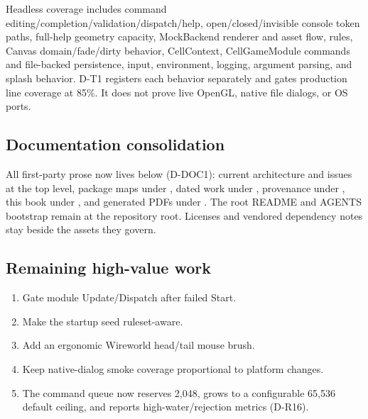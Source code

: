 Headless coverage includes command editing/completion/validation/dispatch/help,
open/closed/invisible console token paths, full-help geometry capacity,
MockBackend renderer and asset flow, rules, Canvas domain/fade/dirty behavior,
CellContext, CellGameModule commands and file-backed persistence, input,
environment, logging, argument parsing, and splash behavior. D-T1 registers
each behavior separately and gates production line coverage at 85\%. It does
not prove live OpenGL, native file dialogs, or OS ports.

\subsection{Documentation consolidation}

All first-party prose now lives below  (D-DOC1): current
architecture and issues at the top level, package maps under ,
dated work under , provenance under , this
book under , and generated PDFs under . The
root README and AGENTS bootstrap remain at the repository root. Licenses and
vendored dependency notes stay beside the assets they govern.

\subsection{Remaining high-value work}

\begin{enumerate}
  \item Gate module Update/Dispatch after failed Start.
  \item Make the startup seed ruleset-aware.
  \item Add an ergonomic Wireworld head/tail mouse brush.
  \item Keep native-dialog smoke coverage proportional to platform changes.
  \item The command queue now reserves 2,048, grows to a configurable 65,536
        default ceiling, and reports high-water/rejection metrics (D-R16).
\end{enumerate}
